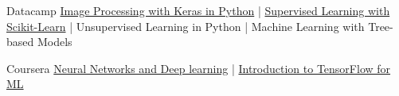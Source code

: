 



\begin{cvskills}
  \cvskill
    {Datacamp} %
    {\href{https://www.datacamp.com/statement-of-accomplishment/course/ec40419232d42b4a49ac5b7f085718a6a61b55c3}{Image Processing with Keras in Python} | \href{https://www.datacamp.com/statement-of-accomplishment/course/5e6166941622fc327971502d9e2d21ae2a289a07}{Supervised Learning with Scikit-Learn} | Unsupervised Learning in Python | Machine Learning with Tree-based Models} %

  \cvskill
    {Coursera} %
    {\href{https://coursera.org/share/e90ca390714ee31c6d83e824207cba3d}{Neural Networks and Deep learning} | \href{https://coursera.org/share/ccfc5b3fe423331505819b404dc8f7aa}{Introduction to TensorFlow for ML}} %

\end{cvskills}